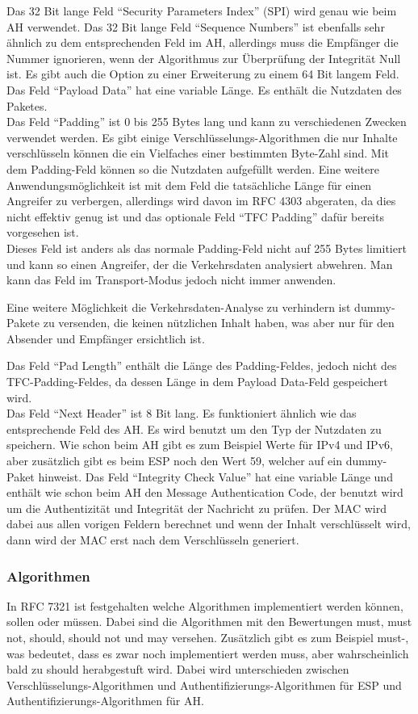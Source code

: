 \documentclass[12pt]{scrartcl}
\begin{document}
Das 32 Bit lange Feld "`Security Parameters Index"' (SPI) wird genau wie beim AH verwendet. Das 32 Bit lange Feld "`Sequence Numbers"' ist ebenfalls sehr ähnlich zu dem entsprechenden Feld im AH, allerdings muss die Empfänger die Nummer ignorieren, wenn der Algorithmus zur Überprüfung der Integrität Null ist. Es gibt auch die Option zu einer Erweiterung zu einem 64 Bit langem Feld.\\
Das Feld "`Payload Data"' hat eine variable Länge. Es enthält die Nutzdaten des Paketes.\\ 
Das Feld "`Padding"' ist 0 bis 255 Bytes lang und kann zu verschiedenen Zwecken verwendet werden. Es gibt einige Verschlüsselungs-Algorithmen die nur Inhalte verschlüsseln können die ein Vielfaches einer bestimmten Byte-Zahl sind. Mit dem Padding-Feld können so die Nutzdaten aufgefüllt werden. Eine weitere Anwendungsmöglichkeit ist mit dem Feld die tatsächliche Länge für einen Angreifer zu verbergen, allerdings wird davon im RFC 4303 abgeraten, da dies nicht effektiv genug ist und das optionale Feld "`TFC Padding"' dafür bereits vorgesehen ist.\cite{RFC4303}\\ 
Dieses Feld ist anders als das normale Padding-Feld nicht auf 255 Bytes limitiert und kann so einen Angreifer, der die Verkehrsdaten analysiert abwehren. Man kann das Feld im Transport-Modus jedoch nicht immer anwenden. 

Eine weitere Möglichkeit die Verkehrsdaten-Analyse zu verhindern ist dummy-Pakete zu versenden, die keinen nützlichen Inhalt haben, was aber nur für den Absender und Empfänger ersichtlich ist.

Das Feld "`Pad Length"' enthält die Länge des Padding-Feldes, jedoch nicht des TFC-Padding-Feldes, da dessen Länge in dem Payload Data-Feld gespeichert wird.\\
Das Feld "`Next Header"' ist 8 Bit lang. Es funktioniert ähnlich wie das entsprechende Feld des AH. Es wird benutzt um den Typ der Nutzdaten zu speichern. Wie schon beim AH gibt es zum Beispiel Werte für IPv4 und IPv6, aber zusätzlich gibt es beim ESP noch den Wert 59, welcher auf ein dummy-Paket hinweist. Das Feld "`Integrity Check Value"' hat eine variable Länge und enthält wie schon beim AH den Message Authentication Code, der benutzt wird um die Authentizität und Integrität der Nachricht zu prüfen. Der MAC wird dabei aus allen vorigen Feldern berechnet und wenn der Inhalt verschlüsselt wird, dann wird der MAC erst nach dem Verschlüsseln generiert. 

\subsubsection{Algorithmen}
In RFC 7321 ist festgehalten welche Algorithmen implementiert werden können, sollen oder müssen.\cite{RFC7321} Dabei sind die Algorithmen mit den Bewertungen must, must not, should, should not und may versehen. Zusätzlich gibt es zum Beispiel must-, was bedeutet, dass es zwar noch implementiert werden muss, aber wahrscheinlich bald zu should herabgestuft wird. Dabei wird unterschieden zwischen Verschlüsselungs-Algorithmen und Authentifizierungs-Algorithmen für ESP und Authentifizierungs-Algorithmen für AH.
\end{document}
